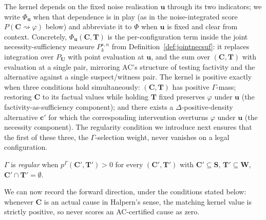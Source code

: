 \medskip\noindent The kernel depends on the fixed noise realisation $\mathbf{u}$
through its two indicators; we write $\Phi_{\mathbf{u}}$ when that dependence is in play
(as in the noise-integrated score $P(\mathbf{C}\!\rightsquigarrow\!\varphi)$ below) and
abbreviate it to $\Phi$ when $\mathbf{u}$ is fixed and clear from context. Concretely,
$\Phi_{\mathbf{u}}(\mathbf{C},\mathbf{T})$ is the
per-configuration term inside the joint necessity-sufficiency measure $P_k^{s,n}$
from Definition~\ref{def:jointnecsuf}: it replaces integration over $P_{\mathbf{U}}$
with point evaluation at $\mathbf{u}$, and the sum over $(\mathbf{C},\mathbf{T})$
with evaluation at a single pair, mirroring AC's structure of
testing factivity and the alternative against a single suspect/witness pair. The
kernel is positive exactly when three conditions hold simultaneously:
$(\mathbf{C},\mathbf{T})$ has positive $\Gamma$-mass; restoring $\mathbf{C}$ to its
factual values while holding $\mathbf{T}$ fixed preserves $\varphi$ under $\mathbf{u}$
(the factivity-as-sufficiency component); and there exists a
$\Delta$-positive-density alternative $\mathbf{c}'$ for which the corresponding
intervention overturns $\varphi$ under $\mathbf{u}$ (the necessity component). The
regularity condition we introduce next ensures that the first of these three, the
$\Gamma$-selection weight, never vanishes on a legal configuration.

\begin{definition}\label{def:regular}
$\Gamma$ is \emph{regular} when $p^\Gamma(\mathbf{C}',\mathbf{T}')>0$ for every
$(\mathbf{C}',\mathbf{T}')$ with $\mathbf{C}'\subseteq\mathbf{S}$,
$\mathbf{T}'\subseteq\mathbf{W}$, $\mathbf{C}'\cap\mathbf{T}'=\emptyset$.
\end{definition}

We can now record the forward direction, under the conditions stated below:
whenever $\mathbf{C}$ is an actual cause in Halpern's sense, the matching kernel
value is strictly positive, so \ourapproach{} never scores an AC-certified cause
as zero.

